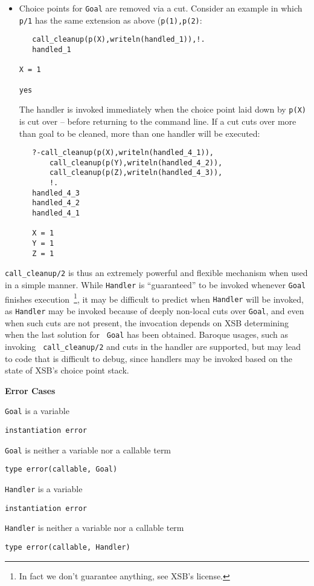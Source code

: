 \begin{description}
\begin{itemize}
\item Choice points for {\tt Goal} are removed via a cut.  Consider an
  example in which {\tt p/1} has the same extension as above ({\tt p(1),p(2)}:
\begin{verbatim}
   call_cleanup(p(X),writeln(handled_1)),!.
   handled_1

X = 1

yes	
\end{verbatim}
The handler is invoked immediately when the choice point laid down by
{\tt p(X)} is cut over -- before returning to the command line.  If a
cut cuts over more than goal to be cleaned, more than one handler will be executed:
\begin{verbatim}
   ?-call_cleanup(p(X),writeln(handled_4_1)),
       call_cleanup(p(Y),writeln(handled_4_2)),
       call_cleanup(p(Z),writeln(handled_4_3)),
       !.
   handled_4_3
   handled_4_2
   handled_4_1
 
   X = 1
   Y = 1
   Z = 1
\end{verbatim}
\end{itemize}

{\tt call\_cleanup/2} is thus an extremely powerful and flexible
mechanism when used in a simple manner.  While {\tt Handler} is
``guaranteed'' to be invoked whenever {\tt Goal} finishes
execution~\footnote{In fact we don't guarantee anything, see XSB's
  license.}, it may be difficult to predict when {\tt Handler} will be
invoked, as {\tt Handler} may be invoked because of deeply non-local
cuts over {\tt Goal}, and even when such cuts are not present, the
invocation depends on XSB determining when the last solution for {\tt
  Goal} has been obtained.  Baroque usages, such as invoking {\tt
  call\_cleanup/2} and cuts in the handler are supported, but may lead
to code that is difficult to debug, since handlers may be invoked
based on the state of XSB's choice point stack.  

{\bf Error Cases}
\begin{description}
\item  {\tt Goal} is a variable
\bi
\item {\tt instantiation error}
\ei
\item  {\tt Goal} is neither a variable nor a callable term
\bi
\item  {\tt type error(callable, Goal)}
\ei
\item  {\tt Handler} is a variable
\bi
\item  {\tt instantiation error}
\ei
\item  {\tt Handler} is neither a variable nor a callable term
\bi
\item {\tt type error(callable, Handler)}
\ei
\end{description}

\end{description}



